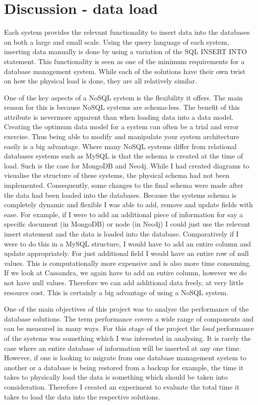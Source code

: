\section{Discussion - data load}\label{loaddiscussion}
Each system provides the relevant functionality to insert data into the databases on both a large and small scale. Using the query language of each system, inserting data manually is done by using a variation of the SQL INSERT INTO statement. This functionality is seen as one of the minimum requirements for a database management system. While each of the solutions have their own twist on how the physical load is done, they are all relatively similar.

One of the key aspects of a NoSQL system is the flexibility it offers. The main reason for this is because NoSQL systems are schema-less. The benefit of this attribute is nevermore apparent than when loading data into a data model. Creating the optimum data model for a system can often be a trial and error exercise. Thus being able to modify and manipulate your system architecture easily is a big advantage. Where many NoSQL systems differ from relational databases systems such as MySQL is that the schema is created at the time of load. Such is the case for MongoDB and Neo4j. While I had created diagrams to visualise the structure of these systems, the physical schema had not been implemented. Consequently, some changes to the final schema were made after the data had been loaded into the databases. Because the systems schema is completely dynamic and flexible I was able to add, remove and update fields with ease. For example, if I were to add an additional piece of information for say a specific document (in MongoDB) or node (in Neo4j) I could just use the relevant insert statement and the data is loaded into the database. Comparatively if I were to do this in a MySQL structure, I would have to add an entire column and update appropriately. For just additional field I would have an entire row of null values. This is computationally more expensive and is also more time consuming. If we look at Cassandra, we again have to add an entire column, however we do not have null values. Therefore we can add additional data freely, at very little resource cost. This is certainly a big advantage of using a NoSQL system.

One of the main objectives of this project was to analyse the performance of the database solutions. The term performance covers a wide range of components and can be measured in many ways. For this stage of the project the \textit{load} performance of the systems was something which I was interested in analysing. It is rarely the case where an entire database of information will be inserted at any one time. However, if one is looking to migrate from one database management system to another or a database is being restored from a backup for example, the time it takes to physically load the data is something which should be taken into consideration. Therefore I created an experiment to evaluate the total time it takes to load the data into the respective solutions.

